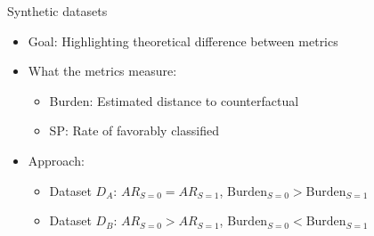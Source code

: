 \documentclass[handout,aspectratio=169]{beamer}
\begin{document}
\begin{frame}{Synthetic datasets}
\begin{itemize}
    \item Goal: Highlighting theoretical difference between metrics
    \item What the metrics measure:
    \begin{itemize}
        \item Burden: Estimated \alert{distance} to counterfactual
        \item SP: \alert{Rate} of favorably classified
    \end{itemize}
    \item Approach:
    \begin{itemize}
        \item Dataset $D_A$: $AR_{S=0} = AR_{S=1}$, $\text{Burden}_{S=0} > \text{Burden}_{S=1}$ 
        \item Dataset $D_B$: $AR_{S=0} > AR_{S=1}$, $\text{Burden}_{S=0} < \text{Burden}_{S=1}$ 
    \end{itemize}
\end{itemize}
\end{frame}
\end{document}
